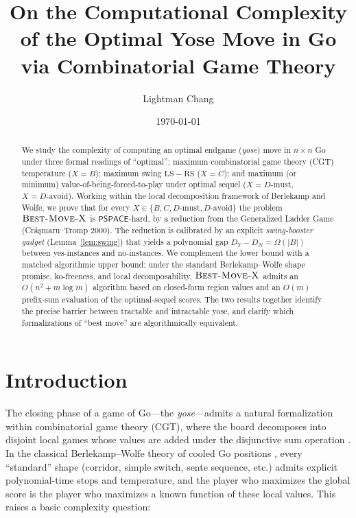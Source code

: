 \documentclass[11pt,a4paper]{amsart}
\title[Complexity of Optimal Yose Move in Go]{On the Computational Complexity\\
  of the Optimal Yose Move in Go via Combinatorial Game Theory}
\author{Lightman Chang}
\date{\today}
\theoremstyle{definition}
\theoremstyle{remark}
\newcommand{\LS}{\mathrm{LS}}
\newcommand{\RS}{\mathrm{RS}}
\newcommand{\PSPACE}{\mathsf{PSPACE}}
\newcommand{\BMX}{\textsc{Best-Move-X}}
\begin{document}
\maketitle

\begin{abstract}
We study the complexity of computing an optimal endgame (\emph{yose}) move
in $n \times n$ Go under three formal readings of ``optimal'': maximum
combinatorial game theory (CGT) temperature ($X = B$); maximum
swing $\LS - \RS$ ($X = C$); and maximum (or minimum) value-of-being-forced-to-play
under optimal sequel ($X = D\text{-must}$, $X = D\text{-avoid}$). Working
within the local decomposition framework of Berlekamp and Wolfe, we prove
that for every $X \in \{B, C, D\text{-must}, D\text{-avoid}\}$ the problem
$\BMX$ is $\PSPACE$-hard, by a reduction from the Generalized Ladder Game
(Cr\^{a}\c{s}maru--Tromp 2000). The reduction is calibrated by an explicit
\emph{swing-booster gadget} (Lemma~\ref{lem:swing}) that yields a polynomial
gap $D_Y - D_N = \Omega(|B|)$ between yes-instances and no-instances. We
complement the lower bound with a matched algorithmic upper bound: under the
standard Berlekamp--Wolfe shape promise, ko-freeness, and local
decomposability, $\BMX$ admits an
$O(n^2 + m \log m)$ algorithm based on closed-form region values and an
$O(m)$ prefix-sum evaluation of the optimal-sequel scores. The two
results together identify the precise barrier between tractable and
intractable yose, and clarify which formalizations of ``best move'' are
algorithmically equivalent.
\end{abstract}

\section{Introduction}\label{sec:intro}

The closing phase of a game of Go---the \emph{yose}---admits a natural
formalization within combinatorial game theory (CGT), where the board
decomposes into disjoint local games whose values are added under the
disjunctive sum operation \cite{Conway1976,BCG1982}. In the classical
Berlekamp--Wolfe theory of cooled Go positions \cite{BW1994}, every
``standard'' shape (corridor, simple switch, sente sequence, etc.) admits
explicit polynomial-time stops and temperature, and the player who maximizes
the global score is the player who maximizes a known function of these
local values. This raises a basic complexity question:
\end{document}
